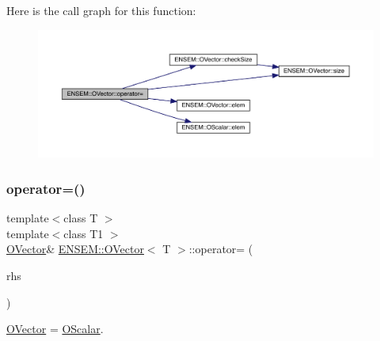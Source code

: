 Here is the call graph for this function\+:
\nopagebreak
\begin{figure}[H]
\begin{center}
\leavevmode
\includegraphics[width=350pt]{d0/d8d/classENSEM_1_1OVector_a31b08dda73879d2a39c4a0bec90bc401_cgraph}
\end{center}
\end{figure}
\mbox{\label{classENSEM_1_1OVector_a31b08dda73879d2a39c4a0bec90bc401}} 
\subsubsection{\texorpdfstring{operator=()}{operator=()}\hspace{0.1cm}{\footnotesize\ttfamily [4/8]}}
{\footnotesize\ttfamily template$<$class T $>$ \\
template$<$class T1 $>$ \\
\mbox{\hyperlink{classENSEM_1_1OVector}{O\+Vector}}\& \mbox{\hyperlink{classENSEM_1_1OVector}{E\+N\+S\+E\+M\+::\+O\+Vector}}$<$ T $>$\+::operator= (\begin{DoxyParamCaption}\item[{const \mbox{\hyperlink{classENSEM_1_1OScalar}{O\+Scalar}}$<$ T1 $>$ \&}]{rhs }\end{DoxyParamCaption})\hspace{0.3cm}{\ttfamily [inline]}}



\mbox{\hyperlink{classENSEM_1_1OVector}{O\+Vector}} = \mbox{\hyperlink{classENSEM_1_1OScalar}{O\+Scalar}}. 

